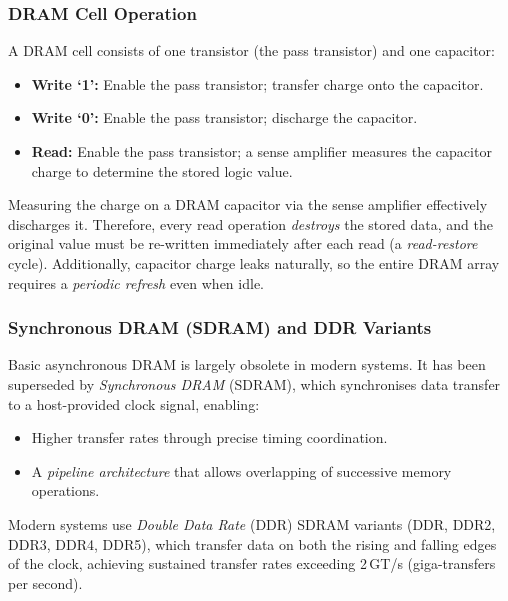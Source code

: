 \documentclass[11pt, a4paper, notitlepage]{report}
\theoremstyle{definition}
\theoremstyle{remark}
\theoremstyle{definition}
\begin{document}
\subsubsection{DRAM Cell Operation}

A DRAM cell consists of one transistor (the pass transistor) and one capacitor:

\begin{itemize}
  \item \textbf{Write `1':} Enable the pass transistor; transfer charge onto the capacitor.
  \item \textbf{Write `0':} Enable the pass transistor; discharge the capacitor.
  \item \textbf{Read:} Enable the pass transistor; a sense amplifier measures the capacitor charge to determine the stored logic value.
\end{itemize}

\begin{warning}[title={Warning: DRAM Read is Destructive}]
  Measuring the charge on a DRAM capacitor via the sense amplifier effectively discharges it. Therefore, every read operation \emph{destroys} the stored data, and the original value must be re-written immediately after each read (a \emph{read-restore} cycle). Additionally, capacitor charge leaks naturally, so the entire DRAM array requires a \emph{periodic refresh} even when idle.
\end{warning}

\subsubsection{Synchronous DRAM (SDRAM) and DDR Variants}

Basic asynchronous DRAM is largely obsolete in modern systems. It has been superseded by \emph{Synchronous DRAM} (SDRAM), which synchronises data transfer to a host-provided clock signal, enabling:
\begin{itemize}
  \item Higher transfer rates through precise timing coordination.
  \item A \emph{pipeline architecture} that allows overlapping of successive memory operations.
\end{itemize}

Modern systems use \emph{Double Data Rate} (DDR) SDRAM variants (DDR, DDR2, DDR3, DDR4, DDR5), which transfer data on both the rising and falling edges of the clock, achieving sustained transfer rates exceeding 2\,GT/s (giga-transfers per second).
\end{document}
